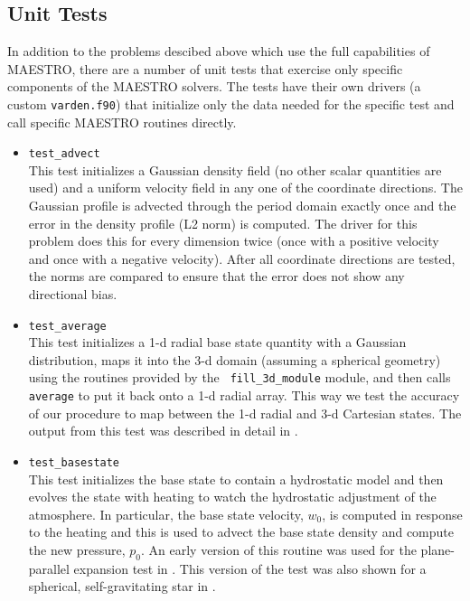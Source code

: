 \subsection{Unit Tests}

\label{sec:unit_tests}

In addition to the problems descibed above which use the full
capabilities of MAESTRO, there are a number of unit tests that
exercise only specific components of the MAESTRO solvers.  The
tests have their own drivers (a custom {\tt varden.f90}) that
initialize only the data needed for the specific test and call
specific MAESTRO routines directly.

\begin{itemize}
\item {\tt test\_advect} \\[-3mm]

  This test initializes a Gaussian density field (no other scalar
  quantities are used) and a uniform velocity field in any one of the
  coordinate directions.  The Gaussian profile is advected through
  the period domain exactly once and the error in the density profile
  (L2 norm) is computed.  The driver for this problem does this 
  for every dimension twice (once with a positive velocity and once
  with a negative velocity).  After all coordinate directions are 
  tested, the norms are compared to ensure that the error does
  not show any directional bias.


\item {\tt test\_average} \\[-3mm]

  This test initializes a 1-d radial base state quantity with a
  Gaussian distribution, maps it into the 3-d domain (assuming a
  spherical geometry) using the routines provided by the {\tt
    fill\_3d\_module} module, and then calls {\tt average} to put it
  back onto a 1-d radial array.  This way we test the accuracy of our
  procedure to map between the 1-d radial and 3-d Cartesian states.
  The output from this test was described in detail in
  \cite{multilevel}.

\item {\tt test\_basestate} \\[-3mm]

  This test initializes the base state to contain a hydrostatic
  model and then evolves the state with heating to watch the 
  hydrostatic adjustment of the atmosphere.  In particular,
  the base state velocity, $w_0$, is computed in response to 
  the heating and this is used to advect the base state density
  and compute the new pressure, $p_0$.  An early version of 
  this routine was used for the plane-parallel expansion test
  in \cite{lowMach2}.  This version of the test was also shown
  for a spherical, self-gravitating star in \cite{multilevel}.


\end{itemize}
